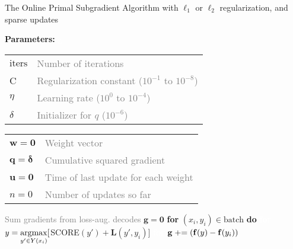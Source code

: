 \begin{algorithm}
\caption{The Online Primal Subgradient Algorithm with $\ell_1$ or $\ell_2$ regularization, and sparse updates}
\label{alg:ops}
\vspace{-5mm}
\setlength\columnsep{-15pt}
\begin{multicols}{2}
\begin{algorithmic}[]
    \State \textbf{Parameters:} \textcolor{white}{g} \\
        \begin{tabular}{ll}
            $\mathrm{iters}$ & \textcolor{gray}{Number of iterations} \\
            C & \textcolor{gray}{Regularization constant ($10^{-1}$ to $10^{-8}$)} \\
            $\eta$ & \textcolor{gray}{Learning rate ($10^0$ to $10^{-4}$)} \\
            $\delta$ & \textcolor{gray}{Initializer for $q$ ($10^{-6}$)} \\[5pt]
        \end{tabular}
    \vspace{1mm}
    \State
    \hspace{-2.5mm}\begin{tabular}{ll}
        $\mathbf{w} = \mathbf{0} $ & \textcolor{gray}{Weight vector} \\
        $\mathbf{q} = \boldsymbol{\delta} $ & \textcolor{gray}{Cumulative squared gradient} \\
        $\mathbf{u} = \mathbf{0} $ & \textcolor{gray}{Time of last update for each weight} \\
        $n = 0$ & \textcolor{gray}{Number of updates so far} \\
    \end{tabular}
            \State \textcolor{gray}{Sum gradients from loss-aug. decodes}
            \State $\mathbf{g} = \mathbf{0}$
            \State \textbf{for} $(x_i,y_i) \in \mathrm{batch}$ \textbf{do}
                \State \textcolor{white}{\textbf{for}} $y = \argmax_{y' \in Y(x_i)} [${\footnotesize SCORE}$(y') + \mathbf{L}(y', y_i) ]$
                \State \textcolor{white}{\textbf{for}}  $\mathbf{g} \mathrel{+}= (\mathbf{f}(y) - \mathbf{f}(y_i))$

\end{algorithmic}
\end{multicols}
\end{algorithm}
